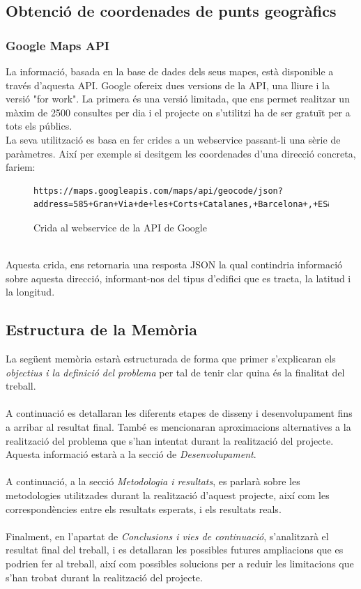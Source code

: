 \documentclass[12pt,a4paper,openright,oneside]{article}
\numberwithin{equation}{section}
\theoremstyle{definition}
\begin{document}
\subsection*{Obtenció de coordenades de punts geogràfics}
\subsubsection*{Google Maps API}
La informació, basada en la base de dades dels seus mapes, està disponible a través d'aquesta API. Google ofereix dues versions de la API, una lliure i la versió "for work". La primera és una versió limitada, que ens permet realitzar un màxim de 2500 consultes per dia i el projecte on s'utilitzi ha de ser gratuït per a tots els públics.\\
La seva utilització es basa en fer crides a un webservice passant-li una sèrie de paràmetres. Així per exemple si desitgem les coordenades d'una direcció concreta, fariem:\\
\begin{figure}[htbp]
\begin{verbatim}
https://maps.googleapis.com/maps/api/geocode/json?
address=585+Gran+Via+de+les+Corts+Catalanes,+Barcelona+,+ES&key=API_KEY
\end{verbatim}
\caption{Crida al webservice de la API de Google}
\end{figure}
\\
Aquesta crida, ens retornaria una resposta JSON la qual contindria informació sobre aquesta direcció, informant-nos del tipus d'edifici que es tracta, la latitud i la longitud.\cite{googleAPI}\\

\subsection{Estructura de la Memòria}
La següent memòria estarà estructurada de forma que primer s'explicaran els \textit{objectius i la definició del problema} per tal de tenir clar quina és la finalitat del treball. \\\\
A continuació es detallaran les diferents etapes de disseny i desenvolupament fins a arribar al resultat final. També es mencionaran aproximacions alternatives a la realització del problema que s'han intentat durant la realització del projecte. Aquesta informació estarà a la secció de \textit{Desenvolupament}.\\\\
A continuació, a la secció \textit{Metodologia i resultats}, es parlarà sobre les metodologies utilitzades durant la realització d'aquest projecte, així com les correspondències entre els resultats esperats, i els resultats reals.\\\\
Finalment, en l'apartat de \textit{Conclusions i vies de continuació}, s'analitzarà el resultat final del treball, i es detallaran les possibles futures ampliacions que es podrien fer al treball, així com possibles solucions per a reduir les limitacions que s'han trobat durant la realització del projecte.
\end{document}
